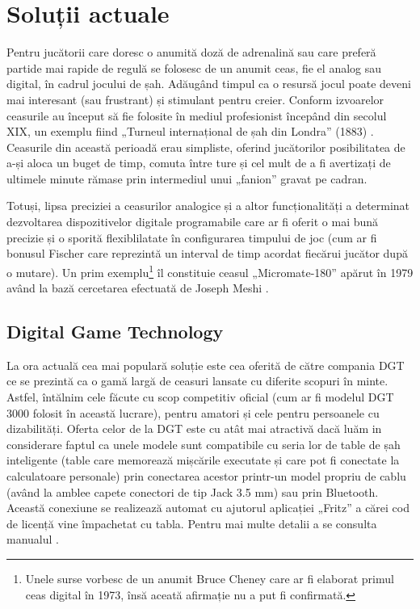 \section{Soluții actuale}

Pentru jucătorii care doresc o anumită doză de adrenalină sau care preferă partide mai rapide de regulă se folosesc de un anumit ceas, fie el analog sau digital, în cadrul jocului de șah. Adăugând timpul ca o resursă jocul poate deveni mai interesant (sau frustrant) și stimulant pentru creier. Conform izvoarelor ceasurile au început să fie folosite în mediul profesionist începând din secolul XIX, un exemplu fiind „Turneul internațional de șah din Londra” (1883) \cite{bcm1883}. Ceasurile din această perioadă erau simpliste, oferind jucătorilor posibilitatea de a-și aloca un buget de timp, comuta între ture și cel mult de a fi avertizați de ultimele minute rămase prin intermediul unui „fanion” gravat pe cadran.

Totuși, lipsa preciziei a ceasurilor analogice și a altor funcționalități a determinat dezvoltarea dispozitivelor digitale programabile care ar fi oferit o mai bună precizie și o sporită flexiblilatate în configurarea timpului de joc (cum ar fi bonusul Fischer care reprezintă un interval de timp acordat fiecărui jucător după o mutare). Un prim exemplu\footnote{Unele surse vorbesc de un anumit Bruce Cheney care ar fi elaborat primul ceas digital în 1973, însă aceată afirmație nu a put fi confirmată.} îl constituie ceasul „Micromate-180” apărut în 1979 având la bază cercetarea efectuată de Joseph Meshi \cite{chess_life1992}.\\

\subsection{Digital Game Technology}
La ora actuală cea mai populară soluție este cea oferită de către compania DGT ce se prezintă ca o gamă largă de ceasuri lansate cu diferite scopuri în minte. Astfel, întălnim cele făcute cu scop competitiv oficial (cum ar fi modelul DGT 3000 folosit în această lucrare), pentru amatori și cele pentru persoanele cu dizabilități. Oferta celor de la DGT este cu atât mai atractivă dacă luăm in considerare faptul ca unele modele sunt compatibile cu seria lor de table de șah inteligente (table care memorează mișcările executate și care pot fi conectate la calculatoare personale) prin conectarea acestor printr-un model propriu de cablu (având la amblee capete conectori de tip Jack 3.5 mm) sau prin Bluetooth. Această conexiune se realizează automat cu ajutorul aplicației „Fritz” a cărei cod de licență vine împachetat cu tabla. Pentru mai multe detalii a se consulta manualul \cite{dgt_eboard_manual}.

